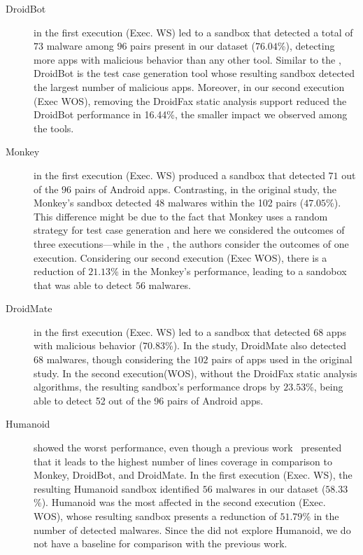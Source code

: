 \begin{description}
\item[DroidBot] in the first execution (Exec. WS) led to a sandbox that detected a total of $73$ malware among $96$ pairs present in our dataset ($76.04$\%),
  detecting more apps with malicious behavior than any other tool. Similar to the \blls, DroidBot is the test case generation tool
  whose resulting sandbox detected the largest number of malicious apps. Moreover, in our second execution (Exec WOS), removing the DroidFax
  static analysis support reduced the DroidBot performance in 16.44\%, the smaller impact we observed among the tools.

  \item [Monkey] in the first execution (Exec. WS) produced a sandbox that detected $71$ out of the $96$ pairs of Android apps.
    Contrasting, in the original study, the Monkey's sandbox detected $48$ malwares within the 102 pairs ($47.05$\%). This difference
    might be due to the fact that Monkey uses a random strategy for test case generation and here we considered the outcomes
    of three executions---while in the \blls, the authors consider the outcomes of one execution. 
    Considering our second execution (Exec WOS), there is a reduction of $21.13$\% in the Monkey's performance, leading to
    a sandobox that was able to detect $56$ malwares. 

  \item[DroidMate] in the first execution (Exec. WS) led to a sandbox that detected 68 apps with malicious behavior ($70.83$\%).
    In the \blls study, DroidMate also detected $68$ malwares, though considering the $102$ pairs of apps used in the
    original study. In the second execution(WOS),
    without the DroidFax static analysis algorithms, the resulting sandbox's performance drops by $23.53$\%, being able to detect
    52 out of the 96 pairs of Android apps.
    
  \item[Humanoid] showed the worst performance, even though a previous work~\cite{DBLP:conf/kbse/LiY0C19} presented that it leads to
    the highest number of lines coverage in comparison to Monkey, DroidBot, and DroidMate. In the first execution (Exec. WS),
    the resulting Humanoid sandbox identified $56$ malwares in our dataset ($58.33$\%). Humanoid was the most affected in the second
    execution (Exec. WOS), whose resulting sandbox presents a redunction of $51.79$\%  in the number of detected malwares.
    Since the \blls did not explore Humanoid,
    we do not have a baseline for comparison with the previous work.


\end{description}
